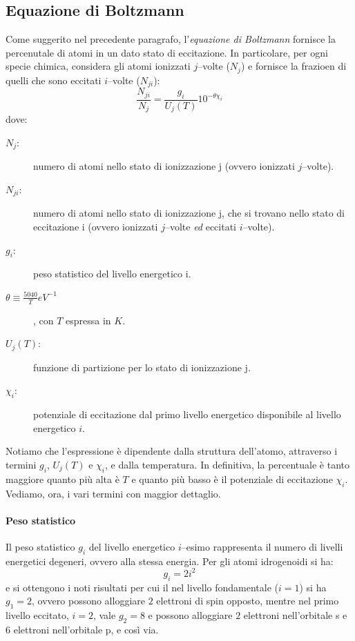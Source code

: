 \subsection{Equazione di Boltzmann}\label{sec:equazione-boltzmann}
Come suggerito nel precedente paragrafo, l'\emph{equazione di Boltzmann} fornisce la percenutale di atomi in un dato stato di eccitazione. In particolare, per ogni specie chimica, considera gli atomi ionizzati $j$--volte ($N_j$) e fornisce la frazioen di quelli che sono eccitati $i$--volte ($N_{ji}$):
\begin{equation}\label{eq:equazione-boltzmann}
    \dfrac{N_{ji}}{N_j} = \dfrac{g_i}{{U_j}(T)} 10^{-\theta \chi_i} 
\end{equation}
dove:
\begin{description}
    \item[$N_j$:] numero di atomi nello stato di ionizzazione j (ovvero ionizzati $j$--volte).
    \item[$N_{ji}$:] numero di atomi nello stato di ionizzazione j, che si trovano nello stato di eccitazione i (ovvero ionizzati $j$--volte \emph{ed} eccitati $i$--volte).
    \item[$g_i$:] peso statistico del livello energetico i.
    \item[$\theta \equiv \frac{5040}{T} \si{eV^{-1}}$], con $T$ espressa in $\si{K}$.
    \item[${U_j}(T)$:] funzione di partizione per lo stato di ionizzazione j.
    \item[$\chi_i$:] potenziale di eccitazione dal primo livello energetico disponibile al livello energetico $i$.      
\end{description}
Notiamo che l'espressione è dipendente dalla struttura dell'atomo, attraverso i termini $g_i$, ${U_j}(T)$ e $\chi_i$, e dalla temperatura. In definitiva, la percentuale è tanto maggiore quanto più alta è $T$ e quanto più basso è il potenziale di eccitazione $\chi_i$. Vediamo, ora, i vari termini con maggior dettaglio.

\paragraph{Peso statistico}
Il peso statistico $g_i$ del livello energetico $i$--esimo rappresenta il numero di livelli energetici degeneri, ovvero alla stessa energia. Per gli atomi idrogenoidi si ha:
\begin{equation*}
g_i = 2 i^2
\end{equation*}
e si ottengono i noti risultati per cui il nel livello fondamentale ($i=1$) si ha $g_1 = 2$, ovvero possono alloggiare $2$ elettroni di spin opposto, mentre nel primo livello eccitato, $i=2$, vale $g_2=8$ e possono alloggiare $2$ elettroni nell'orbitale s e $6$ elettroni nell'orbitale p, e così via.

